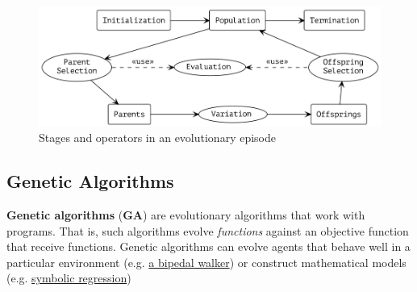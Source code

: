 \documentclass{article}
\begin{document}
\begin{figure}[h]
    \caption{Stages and operators in an evolutionary episode}
    \includegraphics[width=\textwidth]{ramen}    
    \centering
\end{figure}

\subsection{Genetic Algorithms}
\label{sec:genalg}
\textbf{Genetic algorithms} (\textbf{GA}) are evolutionary algorithms that work with programs. That is, such algorithms evolve \textit{functions} against an objective function that receive functions. Genetic algorithms can evolve agents that behave well in a particular environment (e.g. \href{https://www.mdpi.com/2227-7390/11/13/2931}{a bipedal walker}) or construct mathematical models (e.g. \href{https://link.springer.com/article/10.1007/s11831-023-09922-z}{symbolic regression})
\end{document}
